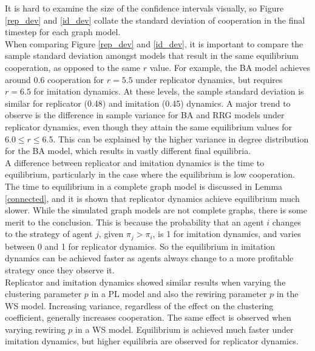 It is hard to examine the size of the confidence intervals visually, so Figure \ref{rep_dev} and \ref{id_dev} collate the standard deviation of cooperation in the final timestep for each graph model. \\
\FloatBarrier
{}
\FloatBarrier
{}
\FloatBarrier
When comparing Figure \ref{rep_dev} and \ref{id_dev}, it is important to compare the sample standard deviation amongst models that result in the same equilibrium cooperation, as opposed to the same $r$ value. For example, the BA model achieves around 0.6 cooperation for $r=5.5$ under replicator dynamics, but requires $r=6.5$ for imitation dynamics. At these levels, the sample standard deviation is similar for replicator (0.48) and imitation (0.45) dynamics. A major trend to observe is the difference in sample variance for BA and RRG models under replicator dynamics, even though they attain the same equilibrium values for $6.0\leq r \leq 6.5$. This can be explained by the higher variance in degree distribution for the BA model, which results in vastly different final equilibria. \\





A difference between replicator and imitation dynamics is the time to equilibrium, particularly in the case where the equilibrium is low cooperation. The time to equilibrium in a complete graph model is discussed in Lemma \ref{connected}, and it is shown that replicator dynamics achieve equilibrium much slower. While the simulated graph models are not complete graphs, there is some merit to the conclusion. This is because the probability that an agent $i$ changes to the strategy of agent $j$, given $\pi_j>\pi_i$, is 1 for imitation dynamics, and varies between 0 and 1 for replicator dynamics. So the equilibrium in imitation dynamics can be achieved faster as agents always change to a more profitable strategy once they observe it. \\



Replicator and imitation dynamics showed similar results when varying the clustering parameter $p$ in a PL model and also the rewiring parameter $p$ in the WS model. Increasing variance, regardless of the effect on the clustering coefficient, generally increases cooperation. The same effect is observed when varying rewiring $p$ in a WS model. Equilibrium is achieved much faster under imitation dynamics, but higher equilibria are observed for replicator dynamics. 





